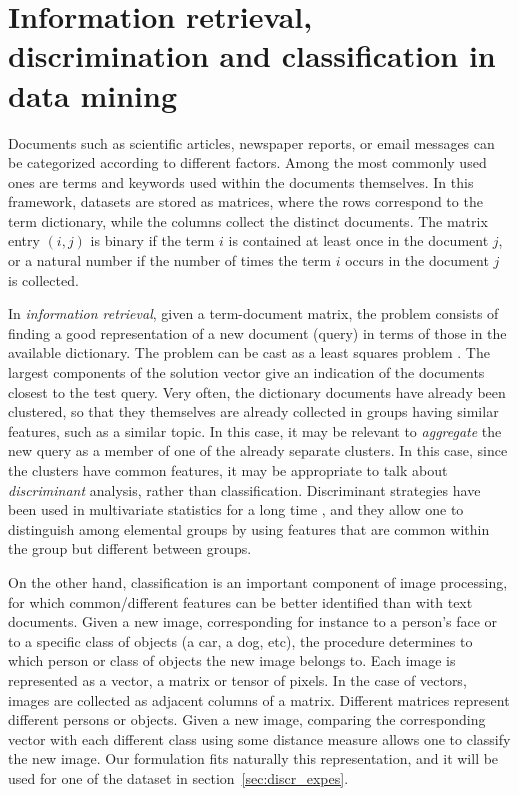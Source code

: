 \documentclass{siamart190516}
\begin{document}
\section{Information retrieval, discrimination and classification in data mining}\label{sec:IR}
Documents such as scientific articles, newspaper reports, or email messages can be categorized according to different factors. Among the most commonly used ones are terms and keywords used within the documents themselves.   In this framework, datasets are stored as
matrices, where the rows correspond to the term dictionary, while the
columns collect the distinct documents. The matrix entry $(i,j)$ is binary if the
term $i$ is contained at least once in the document $j$, or a natural number if the number of times the term $i$ occurs in the document $j$ is collected.

In {\it information retrieval}, given a term-document matrix, the problem consists of finding a good representation of a new document (query) in terms of those in the available dictionary. The problem
can be cast as a least squares problem \cite{EldenBook.19}. The largest components of the
solution vector give an indication of the documents closest to the test query. Very often, the dictionary documents have already
been clustered, so that they themselves are
already collected in groups having similar features, such as a similar topic. In this case, it may be relevant to {\it aggregate}
the new query as a member of one of the already separate clusters. In this case,
since the clusters have common features, 
it may be appropriate to talk about {\it discriminant} analysis, rather than
classification. Discriminant strategies have been used in multivariate statistics for a long
time \cite{Johnson.Wichern.07}, and they allow one to distinguish among elemental groups by using
features that are common within the group but different between groups.

On the other hand, 
classification is an important component of image processing, for which common/different features can be better identified than with text documents. Given a new image, corresponding
for instance to a person's face or to a specific class of objects (a car, a dog, etc),  the procedure determines to which person or class of objects the new image
belongs to. Each image is represented as a vector, a matrix or tensor of pixels.
In the case of vectors, images are collected as adjacent columns of a matrix. 
Different matrices represent different persons or objects.
Given a new image, comparing the corresponding vector with each different 
class using some distance measure allows one to classify the new image.
Our formulation fits naturally this representation, and it will be
used for one of the dataset in section~\ref{sec:discr_expes}.
\end{document}
